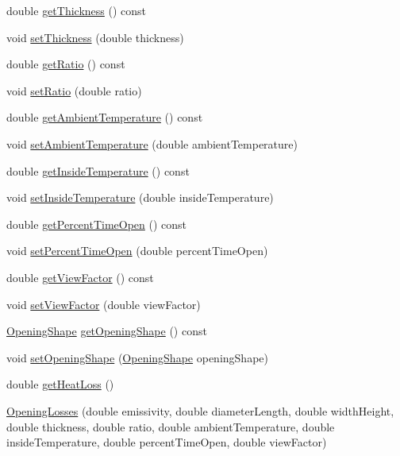 \begin{DoxyCompactItemize}
double \hyperlink{class_opening_losses_aeefdf4431056de65ca84c6dfb24b61e1}{get\+Thickness} () const
\item 
void \hyperlink{class_opening_losses_a221cc88072e4f0975f15c6cd96781dea}{set\+Thickness} (double thickness)
\item 
double \hyperlink{class_opening_losses_ac9f7dbd2cc023932b5d8076a21a3f690}{get\+Ratio} () const
\item 
void \hyperlink{class_opening_losses_aab7f82f24511c37f0bc4b29cbc7239b5}{set\+Ratio} (double ratio)
\item 
double \hyperlink{class_opening_losses_a198f46508744d6943846ea95a9513a45}{get\+Ambient\+Temperature} () const
\item 
void \hyperlink{class_opening_losses_a3624c9fad2a413871b7324f7e957a5ae}{set\+Ambient\+Temperature} (double ambient\+Temperature)
\item 
double \hyperlink{class_opening_losses_abe930dab77b1c855503ee51fdf66c88a}{get\+Inside\+Temperature} () const
\item 
void \hyperlink{class_opening_losses_a895dcaa81bbb3dc823ec903480f05262}{set\+Inside\+Temperature} (double inside\+Temperature)
\item 
double \hyperlink{class_opening_losses_aeefc3790a569008ff2e804033a9efea3}{get\+Percent\+Time\+Open} () const
\item 
void \hyperlink{class_opening_losses_a889b6aa25bf6d8fc8fb284ec0c2a1625}{set\+Percent\+Time\+Open} (double percent\+Time\+Open)
\item 
double \hyperlink{class_opening_losses_ae6633fab7a941e00b9770bee6a3af34d}{get\+View\+Factor} () const
\item 
void \hyperlink{class_opening_losses_a4e6c6f1549e01cd4b82b7505e403d643}{set\+View\+Factor} (double view\+Factor)
\item 
\hyperlink{class_opening_losses_a57f9759b6fd72a1b75aa885800e26157}{Opening\+Shape} \hyperlink{class_opening_losses_a5046cd699178e4edca774d0d0da7965a}{get\+Opening\+Shape} () const
\item 
void \hyperlink{class_opening_losses_a163778704e5bdd1809d05118504da027}{set\+Opening\+Shape} (\hyperlink{class_opening_losses_a57f9759b6fd72a1b75aa885800e26157}{Opening\+Shape} opening\+Shape)
\item 
double \hyperlink{class_opening_losses_a38112eb408f72e252b42a68a41a25d0f}{get\+Heat\+Loss} ()
\item 
\hyperlink{class_opening_losses_a366fd35fabdebffee916dee77d072543}{Opening\+Losses} (double emissivity, double diameter\+Length, double width\+Height, double thickness, double ratio, double ambient\+Temperature, double inside\+Temperature, double percent\+Time\+Open, double view\+Factor)

\end{DoxyCompactItemize}
